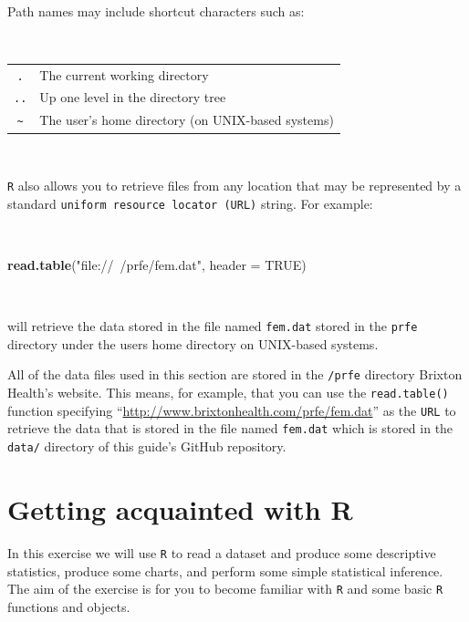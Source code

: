 \documentclass[12pt,a4paper]{book}
\newenvironment{Shaded}{\begin{snugshade}}{\end{snugshade}}
\newcommand{\DataTypeTok}[1]{\textcolor[rgb]{0.13,0.29,0.53}{#1}}
\newcommand{\KeywordTok}[1]{\textcolor[rgb]{0.13,0.29,0.53}{\textbf{#1}}}
\newcommand{\NormalTok}[1]{#1}
\newcommand{\OtherTok}[1]{\textcolor[rgb]{0.56,0.35,0.01}{#1}}
\newcommand{\StringTok}[1]{\textcolor[rgb]{0.31,0.60,0.02}{#1}}
\theoremstyle{definition}
\theoremstyle{definition}
\theoremstyle{definition}
\theoremstyle{remark}
\begin{document}
~

Path names may include shortcut characters such as:

~

\begin{longtable}[]{@{}cl@{}}
\toprule
\endhead
\texttt{.} & The current working directory\tabularnewline
\texttt{..} & Up one level in the directory tree\tabularnewline
\texttt{\textasciitilde{}} & The user's home directory (on UNIX-based
systems)\tabularnewline
\bottomrule
\end{longtable}

~

\texttt{R} also allows you to retrieve files from any location that may
be represented by a standard \texttt{uniform\ resource\ locator\ (URL)}
string. For example:

~

\begin{Shaded}
\begin{Highlighting}[]
\KeywordTok{read.table}\NormalTok{(}\StringTok{"file://~/prfe/fem.dat"}\NormalTok{, }\DataTypeTok{header =} \OtherTok{TRUE}\NormalTok{)}
\end{Highlighting}
\end{Shaded}

~

will retrieve the data stored in the file named \texttt{fem.dat} stored
in the \texttt{prfe} directory under the users home directory on
UNIX-based systems.

All of the data files used in this section are stored in the
\texttt{/prfe} directory Brixton Health's website. This means, for
example, that you can use the \texttt{read.table()} function specifying
``\url{http://www.brixtonhealth.com/prfe/fem.dat}'' as the \texttt{URL}
to retrieve the data that is stored in the file named \texttt{fem.dat}
which is stored in the \texttt{data/} directory of this guide's GitHub
repository.

\hypertarget{exercise1}{%
\chapter{Getting acquainted with R}\label{exercise1}}

In this exercise we will use \texttt{R} to read a dataset and produce
some descriptive statistics, produce some charts, and perform some
simple statistical inference. The aim of the exercise is for you to
become familiar with \texttt{R} and some basic \texttt{R} functions and
objects.
\end{document}
